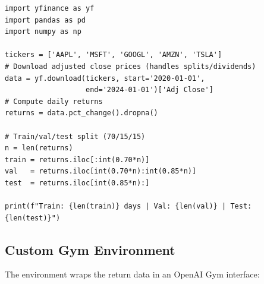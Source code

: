 \documentclass[12pt,a4paper]{article}
\begin{document}
\begin{lstlisting}[caption={Data download and preprocessing},label={lst:data}]
import yfinance as yf
import pandas as pd
import numpy as np

tickers = ['AAPL', 'MSFT', 'GOOGL', 'AMZN', 'TSLA']
# Download adjusted close prices (handles splits/dividends)
data = yf.download(tickers, start='2020-01-01',
                   end='2024-01-01')['Adj Close']
# Compute daily returns
returns = data.pct_change().dropna()

# Train/val/test split (70/15/15)
n = len(returns)
train = returns.iloc[:int(0.70*n)]
val   = returns.iloc[int(0.70*n):int(0.85*n)]
test  = returns.iloc[int(0.85*n):]

print(f"Train: {len(train)} days | Val: {len(val)} | Test: {len(test)}")
\end{lstlisting}

\subsection{Custom Gym Environment}

The environment wraps the return data in an OpenAI Gym interface:
\end{document}
